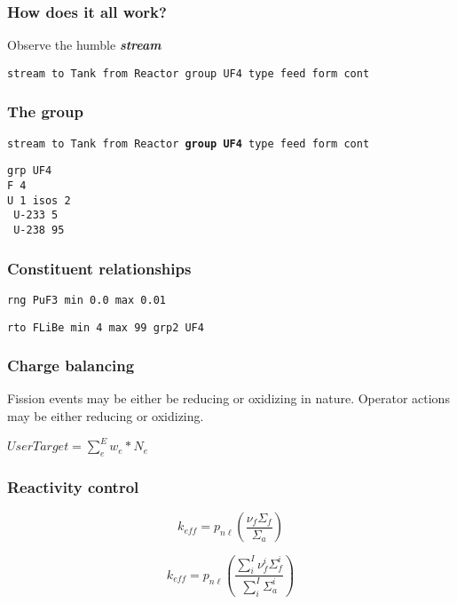 \documentclass{beamer}
\begin{document}
\begin{frame}
\frametitle{How does it all work?}

Observe the humble \textbf{\textit{stream}}

\hspace{2cm}

\small{\texttt{stream to Tank from Reactor group UF4 type feed form cont}}

\end{frame}

\begin{frame}
\frametitle{The group}

\small{\texttt{stream to Tank from Reactor \textbf{group UF4} type feed form cont}}

\hspace{2cm}

\texttt{grp UF4}\\
\texttt{F   4}\\
\texttt{U   1   isos    2}\\
\texttt{    U-233    5}\\
\texttt{    U-238   95}

\end{frame}

\begin{frame}
\frametitle{Constituent relationships}

\texttt{rng PuF3    min 0.0 max 0.01}

\hspace{2cm}

\texttt{rto FLiBe   min 4   max 99  grp2    UF4}

\end{frame}

\begin{frame}
\frametitle{Charge balancing}

Fission events may be either be reducing or oxidizing in nature. Operator
actions may be either reducing or oxidizing.

\hspace{2cm}

$UserTarget = \sum\limits_{e}^{E}w_{e}*N_{e}$

\end{frame}

\begin{frame}
\frametitle{Reactivity control}

    \begin{equation}
    \label{reactivity}
        k_{eff} = p_{n\ell}\left(\frac{\nu_{f}\Sigma_{f}}{\Sigma_{a}}\right)
    \end{equation}

    \begin{equation}
    \label{reactivity_sum}
        k_{eff} = p_{n\ell}\left(\frac{\sum\limits_{i}^{I}\nu_{f}^{i}\Sigma_{f}^{i}}{\sum\limits_{i}^{I}\Sigma_{a}^{i}}\right)
    \end{equation}

\end{frame}
\end{document}
